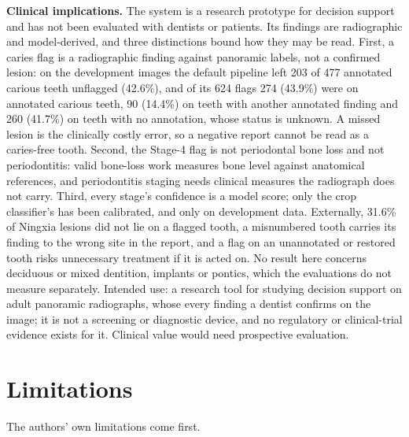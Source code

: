 \documentclass[conference]{IEEEtran}
\begin{document}
\textbf{Clinical implications.} The system is a research prototype for decision support and has not been evaluated with dentists or patients. Its findings are radiographic and model-derived, and three distinctions bound how they may be read. First, a caries flag is a radiographic finding against panoramic labels, not a confirmed lesion: on the development images the default pipeline left 203 of 477 annotated carious teeth unflagged (42.6\%), and of its 624 flags 274 (43.9\%) were on annotated carious teeth, 90 (14.4\%) on teeth with another annotated finding and 260 (41.7\%) on teeth with no annotation, whose status is unknown. A missed lesion is the clinically costly error, so a negative report cannot be read as a caries-free tooth. Second, the Stage-4 flag is not periodontal bone loss and not periodontitis: valid bone-loss work measures bone level against anatomical references, and periodontitis staging needs clinical measures the radiograph does not carry. Third, every stage's confidence is a model score; only the crop classifier's has been calibrated, and only on development data. Externally, 31.6\% of Ningxia lesions did not lie on a flagged tooth, a misnumbered tooth carries its finding to the wrong site in the report, and a flag on an unannotated or restored tooth risks unnecessary treatment if it is acted on. No result here concerns deciduous or mixed dentition, implants or pontics, which the evaluations do not measure separately. Intended use: a research tool for studying decision support on adult panoramic radiographs, whose every finding a dentist confirms on the image; it is not a screening or diagnostic device, and no regulatory or clinical-trial evidence exists for it. Clinical value would need prospective evaluation.

\section{Limitations}

The authors' own limitations come first.
\end{document}

